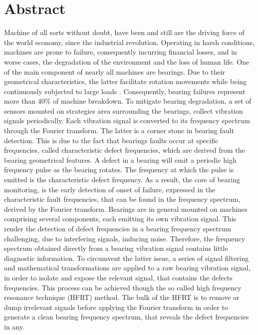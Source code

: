 \documentclass[../Main/thesis.tex]{subfiles}
\begin{document}
\null\vfill
{}
\chapter*{Abstract}
Machine of all sorts without doubt, have been and still are the driving force of the world economy, since the industrial revolution.
Operating in harsh conditions, machines are prone to failure, consequently incurring financial losses, and in worse cases, the degradation of the environment and the loss of human life. 
\justify
 One of the main component of nearly all machines are bearings. Due to their  geometrical characteristics, the latter facilitate rotation movements while being continuously subjected to large loads . Consequently, bearing failures represent more than 40$\%$ of machine breakdown. To mitigate
 bearing degradation, a set of sensors mounted on strategics area surrounding the bearings, collect vibration signals periodically. Each vibration signal is converted to its frequency spectrum through the Fourier transform. The latter is a corner stone in bearing fault detection. This is due to the fact that bearings faults occur at specific frequencies, called characteristic defect frequencies, which are derived from the bearing geometrical features. A defect in a bearing will emit a periodic high frequency pulse as the bearing rotates. The frequency at which the pulse is emitted is the characteristic defect frequency.
 As a result, the core of bearing monitoring, is the early detection of onset of failure, expressed in the characteristic fault frequencies, that can be found in the frequency spectrum, derived by the Fourier transform.
 \justify
 Bearings are in general mounted on machines comprising several components, each emitting its own vibration signal.
 This render the detection of defect frequencies in a bearing frequency spectrum challenging, due to interfering  signals, inducing noise. Therefore, the frequency spectrum obtained directly from a bearing vibration signal contains little diagnostic information. To circumvent the latter issue, a series of signal filtering and mathematical transformations are applied to a raw bearing vibration signal, in order to isolate and expose the relevant signal, that contains the defects frequencies. This process can be achieved though the so called high frequency resonance technique (HFRT) method. The bulk of the HFRT is to remove or dump irrelevant signals before applying the Fourier transform in order to generate a clean bearing frequency spectrum, that reveals the defect frequencies in any.
\end{document}
